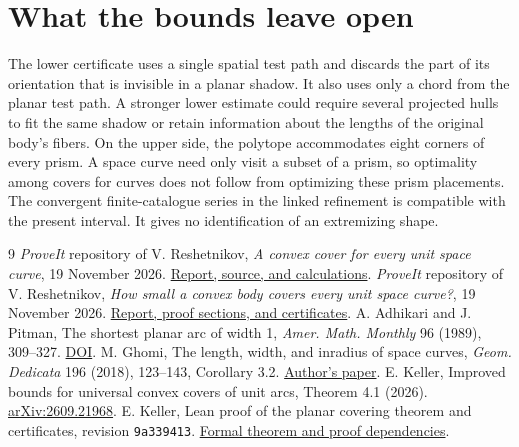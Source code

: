 \documentclass[11pt,letterpaper]{article}
\begin{document}
\section{What the bounds leave open}
The lower certificate uses a single spatial test path and discards the
part of its orientation that is invisible in a planar shadow. It also
uses only a chord from the planar test path. A stronger lower estimate
could require several projected hulls to fit the same shadow or retain
information about the lengths of the original body's fibers. On the
upper side, the polytope accommodates eight corners of every prism.
A space curve need only visit a subset of a prism, so optimality among
covers for curves does not follow from optimizing these prism placements.
The convergent finite-catalogue series in the linked refinement
\cite{refinement} is compatible with the present interval. It gives no
identification of an extremizing shape.
\begin{thebibliography}{9}\small\setlength{\itemsep}{1pt}\setlength{\parskip}{0pt}
 \emph{ProveIt} repository of V. Reshetnikov,
\emph{A convex cover for every unit space curve}, 19 November 2026.
\href{https://github.com/VladimirReshetnikov/ProveIt/tree/main/Logic/PrimitiveRecursiveArithmetic/docs/proofs/geometry/space_worm_2026-11-19}{Report, source, and calculations}.
 \emph{ProveIt} repository of V. Reshetnikov,
\emph{How small a convex body covers every unit space curve?}, 19 November 2026.
\href{https://github.com/VladimirReshetnikov/ProveIt/tree/main/Logic/PrimitiveRecursiveArithmetic/docs/proofs/geometry/space_worm_refinement_2026-11-19}{Report, proof sections, and certificates}.
 A. Adhikari and J. Pitman, The shortest planar arc of
width 1, \emph{Amer. Math. Monthly} 96 (1989), 309--327.
\href{https://doi.org/10.1080/00029890.1989.11972188}{DOI}.
 M. Ghomi, The length, width, and inradius of space curves,
\emph{Geom. Dedicata} 196 (2018), 123--143, Corollary 3.2.
\href{https://ghomi.math.gatech.edu/Papers/inradius.pdf}{Author's paper}.
 E. Keller, Improved bounds for universal convex covers of
unit arcs, Theorem 4.1 (2026). \href{https://arxiv.org/abs/2609.21968}{arXiv:2609.21968}.
 E. Keller, Lean proof of the planar covering theorem
and certificates, revision \texttt{9a339413}. \href{https://github.com/ethan-keller/moser-worm-improved-bounds/blob/9a3394130fe4f7b1df6ffdeffda16601795d9ce4/MoserWorm/UpperBound/Main.lean}{Formal theorem and proof dependencies}.
\end{thebibliography}
\end{document}
